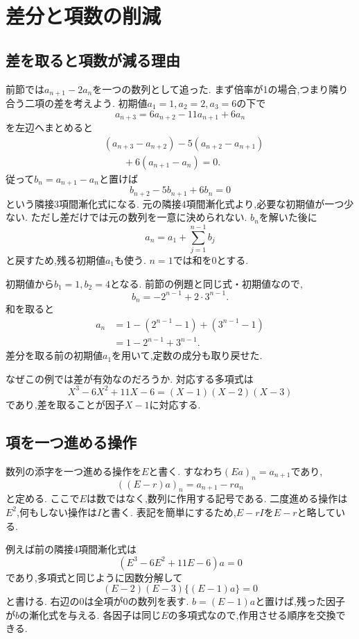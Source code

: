 \section{差分と項数の削減}\label{節：差分と項数の削減}
\subsection{差を取ると項数が減る理由}

前節では$a_{n+1}-2a_n$を一つの数列として追った.
まず倍率が1の場合,つまり隣り合う二項の差を考えよう.
初期値$a_1=1,a_2=2,a_3=6$の下で
\[
 a_{n+3}=6a_{n+2}-11a_{n+1}+6a_n
\]
を左辺へまとめると
\[
 \begin{aligned}
 &(a_{n+3}-a_{n+2})-5(a_{n+2}-a_{n+1})\\
 &\qquad+6(a_{n+1}-a_n)=0.
 \end{aligned}
\]
従って$b_n=a_{n+1}-a_n$と置けば
\[
 b_{n+2}-5b_{n+1}+6b_n=0
\]
という隣接3項間漸化式になる.
元の隣接4項間漸化式より,必要な初期値が一つ少ない.
ただし差だけでは元の数列を一意に決められない.
$b_n$を解いた後に
\[
 a_n=a_1+\sum_{j=1}^{n-1}b_j
\]
と戻すため,残る初期値$a_1$も使う.
$n=1$では和を0とする.


初期値から$b_1=1,b_2=4$となる.
前節の例題と同じ式・初期値なので,
\[
 b_n=-2^{n-1}+2\cdot3^{n-1}.
\]
和を取ると
\[
 \begin{aligned}
 a_n&=1-(2^{n-1}-1)+(3^{n-1}-1)\\
 &=1-2^{n-1}+3^{n-1}.
 \end{aligned}
\]
差分を取る前の初期値$a_1$を用いて,定数の成分も取り戻せた.

なぜこの例では差が有効なのだろうか.
対応する多項式は
\[
 X^3-6X^2+11X-6=(X-1)(X-2)(X-3)
\]
であり,差を取ることが因子$X-1$に対応する.

\subsection{項を一つ進める操作}

数列の添字を一つ進める操作を$E$と書く.
すなわち$(Ea)_n=a_{n+1}$であり,
\[
 ((E-r)a)_n=a_{n+1}-ra_n
\]
と定める. ここで$E$は数ではなく,数列に作用する記号である.
二度進める操作は$E^2$,何もしない操作は$I$と書く.
表記を簡単にするため,$E-rI$を$E-r$と略している.

例えば前の隣接4項間漸化式は
\[
 (E^3-6E^2+11E-6)a=0
\]
であり,多項式と同じように因数分解して
\[
 (E-2)(E-3)\{(E-1)a\}=0
\]
と書ける. 右辺の0は全項が0の数列を表す.
$b=(E-1)a$と置けば,残った因子が$b$の漸化式を与える.
各因子は同じ$E$の多項式なので,作用させる順序を交換できる.

